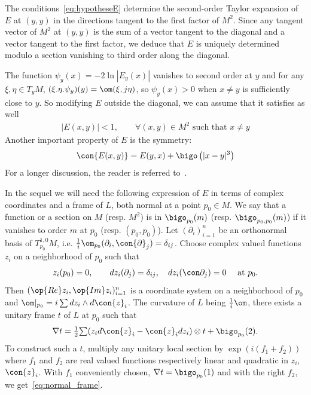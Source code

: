 The conditions~\eqref{eq:hypotheseE} determine the second-order Taylor expansion of $E$ at $(y,y)$ in the directions tangent to the first factor of $M^2$. Since any tangent vector of $M^2$ at $(y,y)$ is the sum of a vector tangent to the diagonal and a vector tangent to the first factor, we deduce that $E$ is uniquely determined modulo a section vanishing to third order along the diagonal.

The function $\psi_y (x)= - 2 \ln |E_y (x)|$ vanishes to second order at $y$ and for any $\xi, \eta \in T_yM$, $(\xi.\eta. \psi_y)(y) = \om (\xi, j \eta)$, so $\psi_y(x)>0$ when $x\neq y$ is sufficiently close to $y$. So modifying $E$ outside the diagonal, we can assume that it satisfies as well
\begin{gather}\label{eq:normE}
|E (x,y) | <1, \qquad \forall (x,y) \in M^2 \text{ such that } x \neq y
\end{gather}
Another important property of $E$ is the symmetry:
\begin{gather}\label{eq:symE}
\con{E (x,y)} = E(y,x) +
\bigo \left(|x-y|^3\right)
\end{gather}
For a longer discussion, the reader is referred to~\cite{oim}.

In the sequel we will need the following expression of $E$ in terms of complex coordinates and a frame of $L$, both normal at a point $p_0 \in M$.  We say that a function or a section on $M$ (resp. $M^2$) is in $\bigo_{p_0} (m)$ (resp. $\bigo_{p_0, p_0} (m)$) if it vanishes to order $m$ at $p_0$ (resp. $(p_0,p_0)$).  Let $(\partial_i)_{i =1}^{n}$ be an orthonormal basis of $T^{1,0}_{p_0} M$, i.e. $\frac{1}{i}\om_{p_0} (\partial_i, \con{\partial}_j) = \delta_{ij}$. Choose complex valued functions $z_i$ on a neighborhood of $p_0$ such that
\begin{gather}\label{eq:coordonnees_z}
z_i (p_0) =0, \qquad dz_i (\partial_j) =\delta_{ij}, \quad dz_i (\con \partial_j) = 0 \quad
\text{ at }p_0.
\end{gather}
Then $(\op{Re} z_i, \op{Im}z_i)_{i=1}^n$ is a coordinate system on a neighborhood of $p_0$ and $\om|_{p_0} = i \sum dz_i \wedge d\con{z}_i$. The curvature of $L$ being $\frac{1}{i} \om$, there exists a unitary frame $t$ of $L$ at $p_0$ such that
\begin{gather}\label{eq:normal_frame}
\nabla t = \tfrac{1}{2} \textstyle{\sum} (z_i d \con{z}_i - \con{z}_i d z_i) \otimes t + \bigo_{p_0} (2).
\end{gather}
To construct such a $t$, multiply any unitary local section by $\exp (i (f_1 + f_2))$ where $f_1$ and $f_2$ are real valued functions respectively linear and quadratic in $z_i$, $\con{z}_i$. With $f_1$ conveniently chosen, $\nabla t = \bigo_{p_0} (1)$ and with the right $f_2$, we get~\eqref{eq:normal_frame}. 


